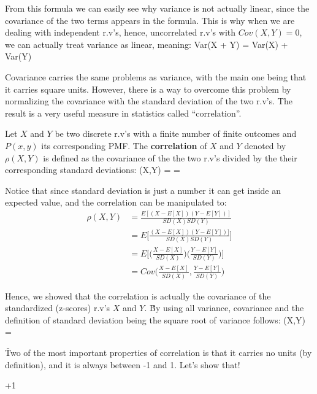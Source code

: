 From this formula we can easily see why variance is not actually linear, since the covariance of the two terms
appears in the formula. This is why when we are dealing with independent r.v's, hence, uncorrelated r.v's with $Cov(X,
Y)=0$, we can actually treat variance as linear, meaning:
\bse
Var(X + Y) = Var(X) + Var(Y)
\ese

Covariance carries the same problems as variance, with the main one being that it carries square units. However,
there is a way to overcome this problem by normalizing the covariance with the standard deviation of the two r.v's.
The result is a very useful measure in statistics called ``correlation''.

\bd[Correlation]
Let $X$ and $Y$ be two discrete r.v's with a finite number of finite outcomes and $P(x,y)$ its corresponding PMF. The
\textbf{correlation} of $X$ and $Y$ denoted by $\rho(X,Y)$ is defined as the covariance of the the two r.v's divided
by the their corresponding standard deviations:
\bse
\rho(X,Y) =  = 
\ese
\ed

Notice that since standard deviation is just a number it can get inside an expected value, and the correlation can be
manipulated to:
\begingroup
\allowdisplaybreaks
{\setlength{\jot}{10pt}
\begin{align*}
\rho(X,Y) &= \frac{ E[(X - E[X])(Y - E[Y])]}{SD(X) SD(Y)} \\
&= E \Big[ \frac{(X - E[X])(Y - E[Y])]}{SD(X) SD(Y)} \Big] \\
&= E \Big[ \Big( \frac{X - E[X]}{SD(X)} \Big) \Big( \frac{Y - E[Y]}{SD(Y)} \Big) \Big] \\
&= Cov \Big( \frac{X - E[X]}{SD(X)}, \frac{Y - E[Y]}{SD(Y)} \Big)
\end{align*}}
\endgroup

Hence, we showed that the correlation is actually the covariance of the standardized (z-scores) r.v's $X$ and $Y$. \v

By using all variance, covariance and the definition of standard deviation being the square root of variance follows:
\bse
\rho(X,Y) = 
\ese

\v

Two of the most important properties of correlation is that it carries no units (by definition), and it is always
between -1 and 1. Let's show that!

\bt[]
 \leq \rho \leq +1
\ese
\et

